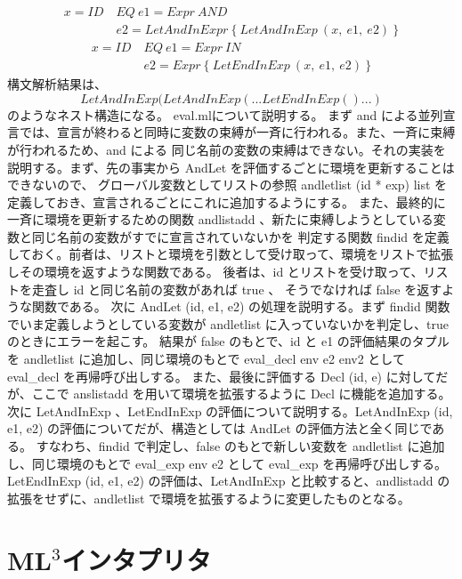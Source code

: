 \documentclass{jreport}
\begin{document}
\begin{equation}
	\begin{split}
	x=ID \ &EQ \ e1=Expr \ AND \ \\ &e2=LetAndInExpr \ \{ \ LetAndInExp \ (x, \ e1, \ e2) \ \}
	\end{split}
\end{equation}
\begin{equation}
	\begin{split}
	x=ID \ &EQ \ e1=Expr \ IN \\ &e2=Expr \ \{ \ LetEndInExp \ (x, \ e1, \ e2) \ \}
	\end{split}
\end{equation}
			構文解析結果は、\begin{equation}LetAndInExp(LetAndInExp(...LetEndInExp()...)\end{equation} のようなネスト構造になる。
			eval.mlについて説明する。
			まず and による並列宣言では、宣言が終わると同時に変数の束縛が一斉に行われる。また、一斉に束縛が行われるため、and による
			同じ名前の変数の束縛はできない。それの実装を説明する。まず、先の事実から AndLet を評価するごとに環境を更新することはできないので、
			グローバル変数としてリストの参照 andletlist (id * exp) list を定義しておき、宣言されるごとにこれに追加するようにする。
			また、最終的に一斉に環境を更新するための関数 andlistadd 、新たに束縛しようとしている変数と同じ名前の変数がすでに宣言されていないかを
			判定する関数 findid を定義しておく。前者は、リストと環境を引数として受け取って、環境をリストで拡張しその環境を返すような関数である。
			後者は、id とリストを受け取って、リストを走査し id と同じ名前の変数があれば true 、
			そうでなければ false を返すような関数である。
			次に AndLet (id, e1, e2) の処理を説明する。まず findid 関数でいま定義しようとしている変数が andletlist に入っていないかを判定し、true のときにエラーを起こす。
			結果が false のもとで、id と e1 の評価結果のタプルを andletlist に追加し、同じ環境のもとで eval\_decl env e2 env2 として eval\_decl を再帰呼び出しする。
			また、最後に評価する Decl (id, e) に対してだが、ここで anslistadd を用いて環境を拡張するように Decl に機能を追加する。
			次に LetAndInExp 、LetEndInExp の評価について説明する。LetAndInExp (id, e1, e2) の評価についてだが、構造としては AndLet の評価方法と全く同じである。
			すなわち、findid で判定し、false のもとで新しい変数を andletlist に追加し、同じ環境のもとで eval\_exp env e2 として eval\_exp を再帰呼び出しする。
			LetEndInExp (id, e1, e2) の評価は、LetAndInExp と比較すると、andlistadd の拡張をせずに、andletlist で環境を拡張するように変更したものとなる。
	\chapter{ML$^3$インタプリタ}
\end{document}
